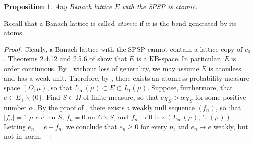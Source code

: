 \documentclass[12pt]{amsart}
\theoremstyle{plain}
\newtheorem{proposition}[theorem]{Proposition}
\theoremstyle{definition}
\renewcommand{\geq}{\geqslant}\usepackage{amssymb}
\begin{document}
\begin{proposition}\label{prop:SPSP_atomless}
Any Banach lattice $E$ with the SPSP is atomic.
\end{proposition}

Recall that a Banach lattice is called \emph{atomic} if it is the
band generated by its atoms.

\begin{proof}
Clearly, a Banach lattice with the SPSP cannot contain a lattice
copy of $c_0$. Theorems 2.4.12 and 2.5.6 of \cite{M-N} show that
$E$ is a KB-space. In particular, $E$ is order continuous.
By \cite[Proposition~1.a.9]{LT2}, without loss of generality, we may assume $E$ is atomless and  has a weak unit. Therefore, by  \cite[Theorem~1.b.4]{LT2}, there exists an atomless probability measure space $(\Omega,\mu)$, so that
$L_\infty(\mu) \subset E \subset L_1(\mu)$. Suppose,
furthermore, that $e \in E_+ \backslash \{0\}$. Find $S \subset \Omega$
of finite measure, so that $e\chi_{S} > \alpha \chi_{S} $ for some positive number $\alpha$. By the proof of
\cite[Proposition 2.1]{CW}, there exists a weakly null sequence $(f_n)$,
so that $|f_n| = 1$ $\mu$-a.e. on $S$, $f_n = 0$ on $\Omega \backslash S$,
and $f_n \to 0$ in $\sigma(L_\infty(\mu), L_1(\mu))$. Letting
$e_n = e + f_n$, we conclude that $e_n \geq 0$ for every $n$,
and $e_n \to e$ weakly, but not in norm.
\end{proof}

\end{document}
